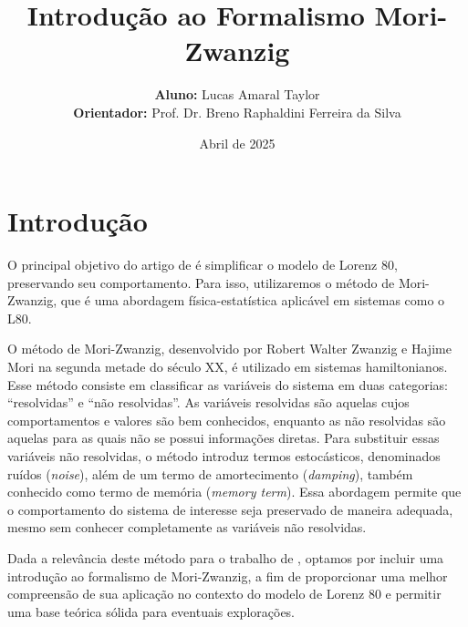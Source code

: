 \documentclass[12pt]{article}
\title{Introdução ao Formalismo Mori-Zwanzig}
\date{Abril de 2025}
\author{
    \textbf{Aluno:} Lucas Amaral Taylor\\
    \textbf{Orientador:} Prof. Dr. Breno Raphaldini Ferreira da Silva
}
\begin{document}
\maketitle

\section{Introdução}
O principal objetivo do artigo de \citet{Chekroun2021} é simplificar o modelo de Lorenz 80, preservando seu comportamento. Para isso, utilizaremos o método de Mori-Zwanzig, que é uma abordagem física-estatística aplicável em sistemas como o L80.

O método de Mori-Zwanzig, desenvolvido por Robert Walter Zwanzig e Hajime Mori na segunda metade do século XX, é utilizado em sistemas hamiltonianos. Esse método consiste em classificar as variáveis do sistema em duas categorias: ``resolvidas'' e ``não resolvidas''. As variáveis resolvidas são aquelas cujos comportamentos e valores são bem conhecidos, enquanto as não resolvidas são aquelas para as quais não se possui informações diretas. Para substituir essas variáveis não resolvidas, o método introduz termos estocásticos, denominados ruídos (\textit{noise}), além de um termo de amortecimento (\textit{damping}), também conhecido como termo de memória (\textit{memory term}). Essa abordagem permite que o comportamento do sistema de interesse seja preservado de maneira adequada, mesmo sem conhecer completamente as variáveis não resolvidas.

Dada a relevância deste método para o trabalho de \citet{Chekroun2021}, optamos por incluir uma introdução ao formalismo de Mori-Zwanzig, a fim de proporcionar uma melhor compreensão de sua aplicação no contexto do modelo de Lorenz 80 e permitir uma base teórica sólida para eventuais explorações.

\end{document}
